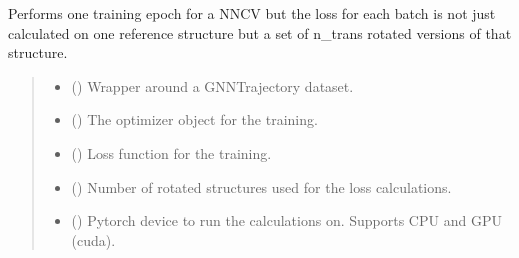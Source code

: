 \documentclass[a4paper,10pt,english]{report}
\begin{document}
\begin{fulllineitems}
\label{\detokenize{NNucleate:NNucleate.training.train_rot}}
\pysigstartsignatures
{}
\pysigstopsignatures
\sphinxAtStartPar
Performs one training epoch for a NNCV but the loss for each batch is not just calculated on one reference structure but a set of n\_trans rotated versions of that structure.
\begin{quote}\begin{description}
\begin{itemize}
\item {} 
\sphinxAtStartPar
{} () \textendash{} Wrapper around a GNNTrajectory dataset.

\item {} 
\sphinxAtStartPar
{} () \textendash{} The optimizer object for the training.

\item {} 
\sphinxAtStartPar
{} () \textendash{} Loss function for the training.

\item {} 
\sphinxAtStartPar
{} () \textendash{} Number of rotated structures used for the loss calculations.

\item {} 
\sphinxAtStartPar
{} () \textendash{} Pytorch device to run the calculations on. Supports CPU and GPU (cuda).


\end{itemize}
\end{description}
\end{quote}
\end{fulllineitems}
\end{document}
